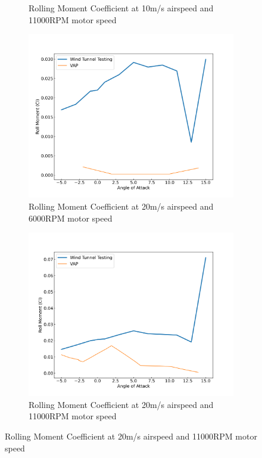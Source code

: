\begin{figure}[H]
\begin{subfigure}[b]{0.467\textwidth}
        \caption{Rolling Moment Coefficient at 10m/s airspeed and 11000RPM motor speed}
        \label{fig:Missing2}
    \end{subfigure}
    \begin{subfigure}[b]{0.467\textwidth}
        \centering
        \includegraphics[width=\textwidth]{05_Results/VAP/tractor/Cl/20ms_6000RPM_Cl.png}
        \caption{Rolling Moment Coefficient at 20m/s airspeed and 6000RPM motor speed}
        \label{fig:VAP_Cl_20ms_6000}
    \end{subfigure}
    \begin{subfigure}[b]{0.467\textwidth}
        \centering
        \includegraphics[width=\textwidth]{05_Results/VAP/tractor/Cl/20ms_11000RPM_Cl.png}
        \caption{Rolling Moment Coefficient at 20m/s airspeed and 11000RPM motor speed}
        \label{fig:VAP_Cl_20ms_11000}
    \end{subfigure}
\end{figure}


